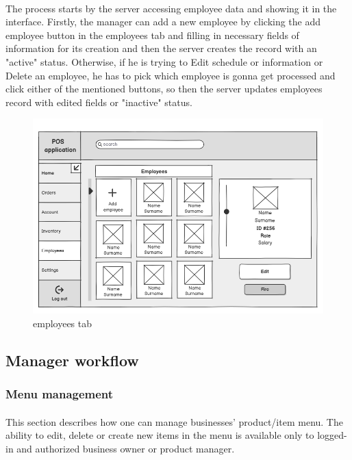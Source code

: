 \documentclass{article}
\begin{document}
    \paragraph{}The process starts by the server accessing employee data and showing it in the interface. Firstly, the manager can add a new employee by clicking the add employee button in the employees tab and filling in necessary fields of information for its creation and then the server creates the record with an "active" status. Otherwise, if he is trying to Edit schedule or information or Delete an employee, he has to pick which employee is gonna get processed and click either of the mentioned buttons, so then the server updates employees record with edited fields or "inactive" status.
    \begin{figure}[H]
        \centering
        \includegraphics[width=0.9\linewidth]{PSP/lab-1/mockups/employees.png}
        \caption{employees tab}
        \label{}
    \end{figure}
    
    \subsection{Manager workflow}
    \subsubsection{Menu management}
    \paragraph{}This section describes how one can manage businesses' product/item menu. The ability to edit, delete or create new items in the menu is available only to logged-in and authorized business owner or product manager.
\end{document}

